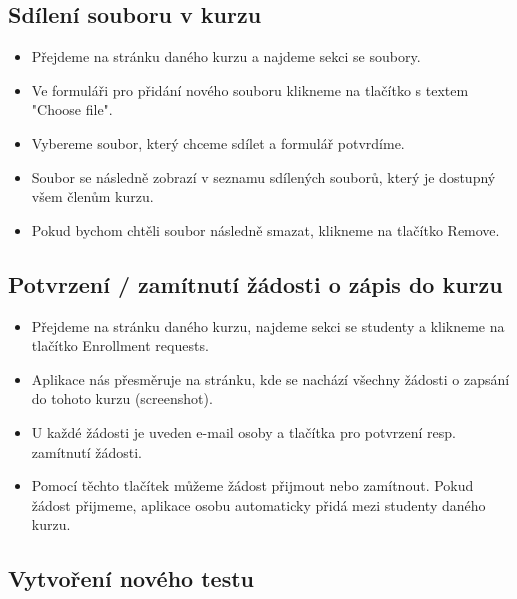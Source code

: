\subsection{Sdílení souboru v kurzu}
\begin{itemize}
	\item Přejdeme na stránku daného kurzu a najdeme sekci se soubory.
	\item Ve formuláři pro přidání nového souboru klikneme na tlačítko s textem "Choose file".
	\item Vybereme soubor, který chceme sdílet a formulář potvrdíme.
	\item Soubor se následně zobrazí v seznamu sdílených souborů, který je dostupný všem členům kurzu.
	\item Pokud bychom chtěli soubor následně smazat, klikneme na tlačítko Remove.
\end{itemize}

\subsection{Potvrzení / zamítnutí žádosti o zápis do kurzu}
\begin{itemize}
	\item Přejdeme na stránku daného kurzu, najdeme sekci se studenty a klikneme na tlačítko Enrollment requests.
	\item Aplikace nás přesměruje na stránku, kde se nachází všechny žádosti o zapsání do tohoto kurzu (screenshot).
	\item U každé žádosti je uveden e-mail osoby a tlačítka pro potvrzení resp. zamítnutí žádosti.
	\item Pomocí těchto tlačítek můžeme žádost přijmout nebo zamítnout. Pokud žádost přijmeme, aplikace osobu automaticky přidá mezi studenty daného kurzu.
\end{itemize}

\subsection{Vytvoření nového testu}

